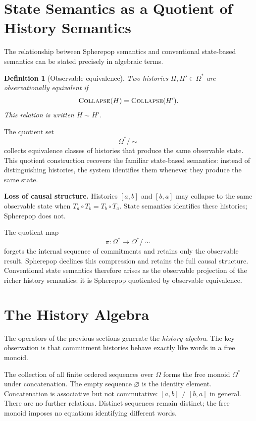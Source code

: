\documentclass[12pt]{article}
\newtheorem{definition}{Definition}[section]
\newcommand{\Collapse}{\operatorname{\textsc{Collapse}}}
\newcommand{\Option}{\Omega}
\newcommand{\Seq}[1]{\left[#1\right]}
\begin{document}
\section{State Semantics as a Quotient of History Semantics}
\label{sec:quotient}

The relationship between Spherepop semantics and conventional state-based semantics can be stated precisely in algebraic terms.

\begin{definition}[Observable equivalence]
Two histories $H, H' \in \Option^*$ are \emph{observationally equivalent} if
\[
\Collapse(H) = \Collapse(H').
\]
This relation is written $H \sim H'$.
\end{definition}

The quotient set
\[
\Option^* / \sim
\]
collects equivalence classes of histories that produce the same observable state. This quotient construction recovers the familiar state-based semantics: instead of distinguishing histories, the system identifies them whenever they produce the same state.

\medskip\noindent\textbf{Loss of causal structure.} Histories $\Seq{a,b}$ and $\Seq{b,a}$ may collapse to the same observable state when $T_a \circ T_b = T_b \circ T_a$. State semantics identifies these histories; Spherepop does not.

The quotient map
\[
\pi : \Option^* \longrightarrow \Option^* / \sim
\]
forgets the internal sequence of commitments and retains only the observable result. Spherepop declines this compression and retains the full causal structure. Conventional state semantics therefore arises as the observable projection of the richer history semantics: it is Spherepop quotiented by observable equivalence.

\section{The History Algebra}
\label{sec:algebra}

The operators of the previous sections generate the \emph{history algebra}. The key observation is that commitment histories behave exactly like words in a free monoid.

The collection of all finite ordered sequences over $\Option$ forms the free monoid $\Option^*$ under concatenation. The empty sequence $\varnothing$ is the identity element. Concatenation is associative but not commutative: $\Seq{a,b} \neq \Seq{b,a}$ in general. There are no further relations. Distinct sequences remain distinct; the free monoid imposes no equations identifying different words.
\end{document}
